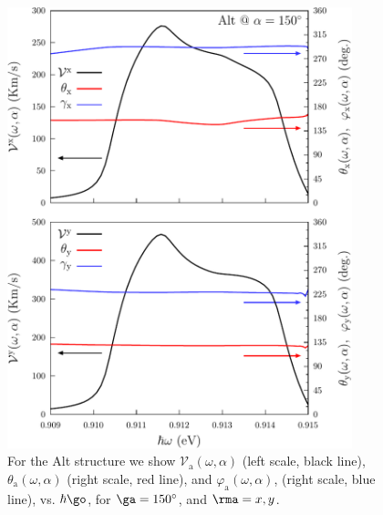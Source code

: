\documentclass[floatfix,prb,aps,superscriptaddress,showpacs,11pt,preprint,letterpaper]{revtex4}
\def\tama{10cm}
\begin{document}
\begin{figure}[tb]
\centering
\includegraphics[width=\tama]{altplots/alt-vx-vy-w2}
\caption{For the Alt structure we show $\mathcal{V}_{\mathrm{a}}
(\omega,\alpha)$ (left scale, black line), $\theta_{\mathrm{a}}
(\omega,\alpha)$ (right scale, red line), and $\varphi_{\mathrm{a}}
(\omega,\alpha)$, (right scale, blue line), vs. $\hbar\go$, for
$\ga=150^\circ$, and $\rma=x,y$. }
\label{fig:alt-vx-vy-w2}
\end{figure}
\end{document}
